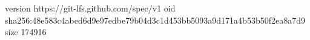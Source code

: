version https://git-lfs.github.com/spec/v1
oid sha256:48e583c4abed6d9e97edbe79b04d3c1d453bb5093a9d171a4b53b50f2ea8a7d9
size 174916
